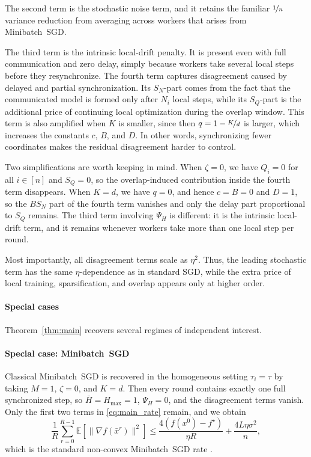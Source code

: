 \documentclass{article}
\newcommand{\Exp}[1]{{\mathbb{E}} \left[ #1 \right]}
\theoremstyle{plain}
\theoremstyle{definition}
\newcommand{\algname}[1]{{\color{alggray}\small\sf#1}\xspace}
\newcommand{\minibatch}{\algname{Minibatch~SGD}}
\newcommand{\minibatchtitle}{Minibatch~SGD}
\begin{document}
The second term is the stochastic noise term, and it retains the familiar \(\nicefrac{1}{n}\) variance reduction from averaging across workers that arises from \minibatch \citep{cotter2011better, gower2019sgd}.

The third term is the intrinsic local-drift penalty.
It is present even with full communication and zero delay, simply because workers take several local steps before they resynchronize.
The fourth term captures disagreement caused by delayed and partial synchronization.
Its \(S_N\)-part comes from the fact that the communicated model is formed only after \(N_i\) local steps, while its \(S_Q\)-part is the additional price of continuing local optimization during the overlap window.
This term is also amplified when \(K\) is smaller, since then \(q=1-\nicefrac{K}{d}\) is larger, which increases the constants \(c\), \(B\), and \(D\).
In other words, synchronizing fewer coordinates makes the residual disagreement harder to control.

Two simplifications are worth keeping in mind.
When \(\zeta=0\), we have \(Q_i=0\) for all \(i \in [n]\) and \(S_Q=0\), so the overlap-induced contribution inside the fourth term disappears.
When \(K=d\), we have \(q=0\), and hence \(c=B=0\) and \(D=1\), so the \(BS_N\) part of the fourth term vanishes and only the delay part proportional to \(S_Q\) remains.
The third term involving \(\Psi_H\) is different:
it is the intrinsic local-drift term, and it remains whenever workers take more than one local step per round.

Most importantly, all disagreement terms scale as \(\eta^2\).
Thus, the leading stochastic term has the same \(\eta\)-dependence as in standard SGD, while the extra price of local training, sparsification, and overlap appears only at higher order.

\paragraph{Special cases}
Theorem~\ref{thm:main} recovers several regimes of independent interest.

\paragraph{Special case: \minibatchtitle}
Classical \minibatch is recovered in the homogeneous setting \(\tau_i=\tau\) by taking \(M=1\), \(\zeta=0\), and \(K=d\).
Then every round contains exactly one full synchronized step, so \(\bar H=H_{\max}=1\), \(\Psi_H=0\), and the disagreement terms vanish.
Only the first two terms in \eqref{eq:main_rate} remain, and we obtain
$$%
    \frac1R\sum_{r=0}^{R-1}\Exp{\|\nabla f(\bar x^r)\|^2}
    \leq
    \frac{4(f(x^0)-f^\star)}{\eta R}
    +
    \frac{4L\eta\sigma^2}{n}
    \!,
$$
which is the standard non-convex \minibatch rate \citep{cotter2011better, gower2019sgd}.
\end{document}
